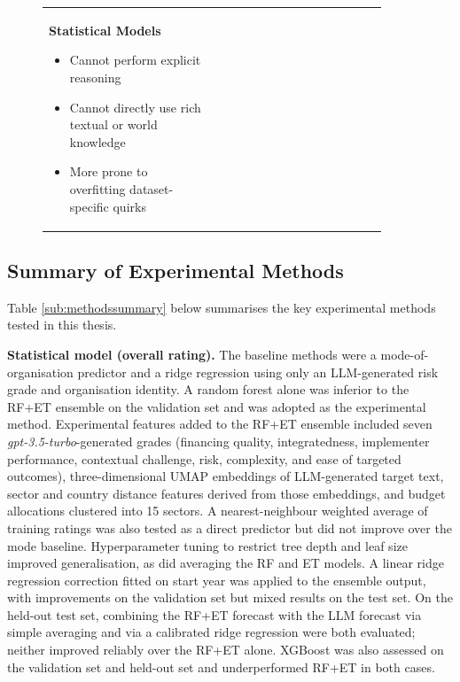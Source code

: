 \begin{figure}[!htbp]
\begin{tabular}{p{0.45\linewidth} p{0.45\linewidth}}
\textbf{Statistical Models}
\begin{itemize}[noitemsep,topsep=0pt]
  \item Cannot perform explicit reasoning
  \item Cannot directly use rich textual or world knowledge
  \item More prone to overfitting dataset-specific quirks
\end{itemize}

\\
\end{tabular}
\label{fig:forecast_strengths_weaknesses}
\end{figure}

\FloatBarrier
\subsection{Summary of Experimental Methods}

Table \ref{sub:methodssummary} below summarises the key experimental methods tested in this thesis.

\textbf{Statistical model (overall rating).}
The baseline methods were a mode-of-organisation predictor and a ridge regression using only an LLM-generated risk grade and organisation identity. A random forest alone was inferior to the RF+ET ensemble on the validation set and was adopted as the experimental method.
Experimental features added to the RF+ET ensemble included seven \emph{gpt-3.5-turbo}-generated grades (financing quality, integratedness, implementer performance, contextual challenge, risk, complexity, and ease of targeted outcomes), three-dimensional UMAP embeddings of LLM-generated target text, sector and country distance features derived from those embeddings, and budget allocations clustered into 15 sectors.
A nearest-neighbour weighted average of training ratings was also tested as a direct predictor but did not improve over the mode baseline.
Hyperparameter tuning to restrict tree depth and leaf size improved generalisation, as did averaging the RF and ET models.
A linear ridge regression correction fitted on start year was applied to the ensemble output, with improvements on the validation set but mixed results on the test set.
On the held-out test set, combining the RF+ET forecast with the LLM forecast via simple averaging and via a calibrated ridge regression were both evaluated; neither improved reliably over the RF+ET alone.
XGBoost was also assessed on the validation set and held-out set and underperformed RF+ET in both cases.

